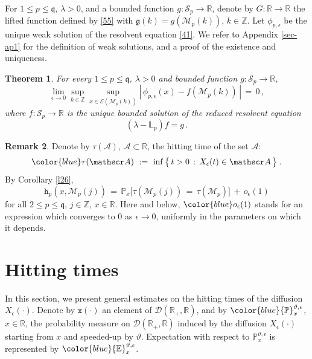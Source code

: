 \documentclass[reqno]{amsart}
\theoremstyle{plain}
\newtheorem{theorem}{Theorem}[section]
\theoremstyle{definition}
\newtheorem{remark}[theorem]{Remark}
\newcommand{\mc}[1]{{\mathcal #1}}
\newcommand{\mf}[1]{{\mathfrak #1}}
\newcommand{\bb}[1]{{\mathbb #1}}
\newcommand{\ms}[1]{{\mathscr #1}}
\newcommand{\mtt}[1]{{\mathtt #1}}
\newcounter{as}[section]
\newcommand{\<}{\langle}
\renewcommand{\>}{\rangle}
\begin{document}
For $1\le p\le \mf q$, $\lambda>0$, and a bounded function
$g\colon \ms S_{p}\to \bb R$, denote by $G \colon \bb R \to \bb R$ the
lifted function defined by \eqref{55} with
$\mf g(k) = g (\ms M_{p}(k))$, $k\in \bb Z$.  Let $\phi_{p,\epsilon}$
be the unique weak solution of the resolvent equation \eqref{41}.  We
refer to Appendix \ref{sec-ap1} for the definition of weak solutions,
and a proof of the existence and uniqueness.

\begin{theorem}
\label{mt4}
For every $1\le p\le \mf q$, $\lambda>0$ and bounded function
$g\colon \ms S_{p}\to \bb R$,
\begin{equation*} 
\lim_{\epsilon \to 0}
\sup_{k\in \bb Z} \sup_{x\in \ms E(\ms M_{p}(k))}
|\, \phi_{p,\epsilon}(x)-f (\ms M_{p}(k))\,| \,=\,  0\,,
\end{equation*}
where $f\colon \ms S_{p} \to \bb R$ is the unique bounded solution of
the reduced resolvent equation
\begin{equation}
\label{42}
(\lambda - \bb L_p)f = g\,.    
\end{equation}
\end{theorem}


\begin{remark}
\label{rm1}
Denote by $\tau (\mathscr{A})$, $\mathscr{A} \subset \bb R$,
the hitting time of the set $\mathscr{A}$:
\begin{equation}
\label{81}
{\color{blue}\tau (\ms A)} \ :=\
\inf\big\{ \, t>0\,:\, X_\epsilon (t) \in \ms A \,\big\} \;.
\end{equation}
By Corollary \ref{l26},
\begin{equation*}
\mtt h_p (x, \ms M_p(j)) \,=\,
\bb P_{x} \big[ \tau (\ms M_p(j)) \,=\,
\tau (\ms M_p)  \big] \,+\, o_\epsilon (1)
\end{equation*}
for all $2\le p\le \mf q$, $j\in \bb Z$, $x\in \bb R$. Here and below,
$\color{blue} o_\epsilon (1)$ stands for an expression which converges
to $0$ as $\epsilon\to 0$, uniformly in the parameters on which it
depends.
\end{remark}



\section{Hitting times}
\label{sec2}

In this section, we present general estimates on the hitting times of
the diffusion $X_\epsilon(\cdot)$. Denote by $\mtt x (\cdot)$ an
element of $\mc D(\bb R_+, \bb R)$, and by
$\color{blue}\bb P^{\vartheta, \epsilon}_x$, $x\in \bb R$, the
probability measure on $\ms D(\bb R_{+}, \bb R)$ induced by the
diffusion $X_\epsilon(\cdot)$ starting from $x$ and speeded-up by
$\vartheta$. Expectation with respect to
$\bb P^{\vartheta, \epsilon}_x$ is represented by
$\color{blue}\bb E^{\vartheta, \epsilon}_x$.
\end{document}
